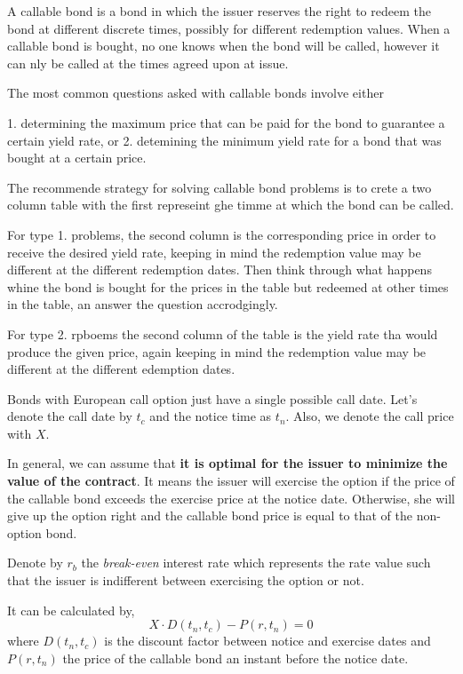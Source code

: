 \documentclass[12pt,a4paper]{article}
\begin{document}
A callable bond is a bond in which the issuer reserves the right to redeem the bond at different discrete times, possibly for different redemption values. When a callable bond is bought, no one knows when the bond will be called, however it can nly be called at the times agreed upon at issue.

The most common questions asked with callable bonds involve either

1. determining the maximum price that can be paid for the bond to guarantee a certain yield rate, or
2. detemining the minimum yield rate for a bond that was bought at a certain price.

The recommende strategy for solving callable bond problems is to crete a two column table with the first represeint ghe timme at which the bond can be called.

For type 1. problems, the second column is the corresponding price in order to receive the desired yield rate, keeping in mind the redemption value may be different at the different redemption dates. Then think through what happens whine the bond is bought for the prices in the table but redeemed at other times in the table, an answer the question accrodgingly.

For type 2. rpboems the second column of the table is the yield rate tha would produce the given price, again keeping in mind the redemption value may be different at the different edemption dates.



Bonds with European call option just have a single possible call date. Let's denote the call date by $t_c$ and the notice time as $t_n$. Also, we denote the call price with $X$. 

In general, we can assume that \textbf{it is optimal for the issuer to minimize the value of the contract}. It means the issuer will exercise the option if the price of the callable bond exceeds the exercise price at the notice date. Otherwise, she will give up the option right and the callable bond price is equal to that of the non-option bond.

Denote by $r_b$ the \emph{break-even} interest rate which represents the rate value such that the issuer is indifferent between exercising the option or not.

It can be calculated by,
\begin{equation}
X\cdot D(t_n, t_c) - P(r,t_n)=0
\end{equation}
where $D(t_n, t_c)$ is the discount factor between notice and exercise dates and $P(r,t_n)$ the price of the callable bond an instant before the notice date.
\end{document}
